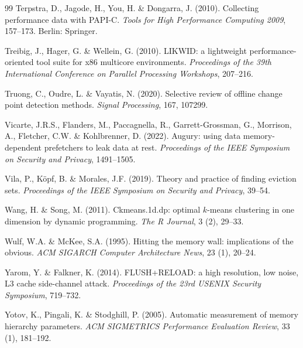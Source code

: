 \documentclass[conference]{IEEEtran}
\begin{document}
\begin{thebibliography}{99}
Terpstra, D., Jagode, H., You, H. \& Dongarra, J. (2010). Collecting performance
data with PAPI-C. \textit{Tools for High Performance Computing 2009}, 157--173.
Berlin: Springer.

Treibig, J., Hager, G. \& Wellein, G. (2010). LIKWID: a lightweight
performance-oriented tool suite for x86 multicore environments.
\textit{Proceedings of the 39th International Conference on Parallel Processing
Workshops}, 207--216.

Truong, C., Oudre, L. \& Vayatis, N. (2020). Selective review of offline change
point detection methods. \textit{Signal Processing}, 167, 107299.

Vicarte, J.R.S., Flanders, M., Paccagnella, R., Garrett-Grossman, G., Morrison,
A., Fletcher, C.W. \& Kohlbrenner, D. (2022). Augury: using data
memory-dependent prefetchers to leak data at rest. \textit{Proceedings of the
IEEE Symposium on Security and Privacy}, 1491--1505.

Vila, P., K\"{o}pf, B. \& Morales, J.F. (2019). Theory and practice of finding
eviction sets. \textit{Proceedings of the IEEE Symposium on Security and
Privacy}, 39--54.

Wang, H. \& Song, M. (2011). Ckmeans.1d.dp: optimal $k$-means clustering in one
dimension by dynamic programming. \textit{The R Journal}, 3 (2), 29--33.

Wulf, W.A. \& McKee, S.A. (1995). Hitting the memory wall: implications of the
obvious. \textit{ACM SIGARCH Computer Architecture News}, 23 (1), 20--24.

Yarom, Y. \& Falkner, K. (2014). FLUSH+RELOAD: a high resolution, low noise, L3
cache side-channel attack. \textit{Proceedings of the 23rd USENIX Security
Symposium}, 719--732.

Yotov, K., Pingali, K. \& Stodghill, P. (2005). Automatic measurement of memory
hierarchy parameters. \textit{ACM SIGMETRICS Performance Evaluation Review},
33 (1), 181--192.

\end{thebibliography}

\appendices

\end{document}
